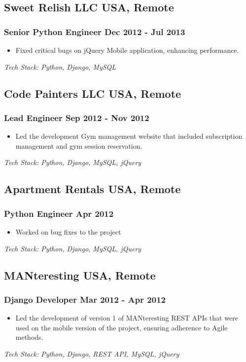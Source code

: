 \documentclass[11pt]{article} %
\newcommand \techstack [1]
    {\small\textit{Tech Stack: {#1}}} %
\begin{document}
\subsection{Sweet Relish LLC \hfill USA, Remote}
\subsubsection{Senior Python Engineer \hfill  Dec 2012 - Jul 2013}
\begin{itemize}
    \item Fixed critical bugs on jQuery Mobile application, enhancing performance.
\end{itemize}
\techstack{Python, Django, MySQL}

\subsection{Code Painters LLC \hfill USA, Remote}
\subsubsection{Lead Engineer \hfill  Sep 2012 - Nov 2012}
\begin{itemize}
    \item Led the development Gym management website that included subscription management and gym session reservation.
\end{itemize}
\techstack{Python, Django, MySQL, jQuery}

\subsection{Apartment Rentals \hfill USA, Remote}
\subsubsection{Python Engineer \hfill  Apr 2012}
\begin{itemize}
    \item Worked on bug fixes to the project
\end{itemize}
\techstack{Python, Django, MySQL, jQuery}

\subsection{MANteresting \hfill USA, Remote}
\subsubsection{Django Developer \hfill  Mar 2012 - Apr 2012}
\begin{itemize}
    \item Led the development of version 1 of MANteresting REST APIs that were used on the mobile version of the project, ensuring adherence to Agile methods.
\end{itemize}
\techstack{Python, Django, REST API, MySQL, jQuery}
\end{document}
